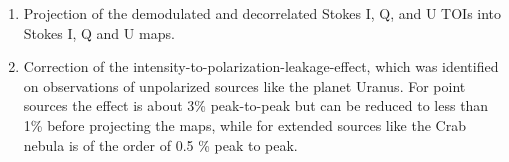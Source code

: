 \documentclass[twocolumn,traditabstract]{aa}
\begin{document}
\begin{enumerate}
\item Projection of the demodulated and decorrelated Stokes I, Q, and U TOIs into Stokes I, Q and U maps.

\item Correction of the intensity-to-polarization-leakage-effect, which was
  identified on observations of unpolarized sources like the planet Uranus. For
  point sources the effect is about 3\% peak-to-peak but can be reduced to
    less than 1\% \citep{ritacco2017} before projecting the maps, while for extended sources like the Crab nebula is of the order of 0.5 \% peak to peak. 



\end{enumerate}
\end{document}
